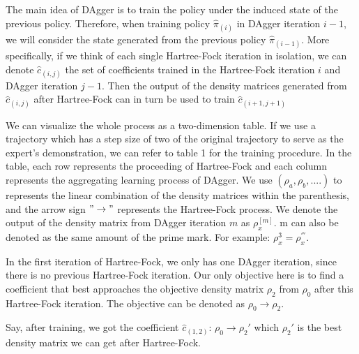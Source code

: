 \documentclass[twoside]{article}
\begin{document}


The main idea of DAgger is to train the policy under the induced state of the previous policy. Therefore, when training policy $\hat{\pi}_{(i)}$ in DAgger iteration $i-1$,
we will consider the state generated from the previous policy $\hat{\pi}_{(i-1)}$. More specifically, if we think of each single Hartree-Fock iteration in isolation, we can denote $\hat{c}_{(i,j)}$ the set of coefficients trained in the Hartree-Fock iteration $i$ and DAgger iteration $j-1$. Then the output of the density matrices generated from $\hat{c}_{(i,j)}$ after Hartree-Fock can in turn be used to train $\hat{c}_{(i+1,j+1)}$



We can visualize the whole process as a two-dimension table. If we use a trajectory which has a step size of two of the original trajectory to serve as the expert's demonstration, we can refer to table 1 for the training procedure.
In the table, each row represents the proceeding of Hartree-Fock and each column represents the aggregating learning process of DAgger. We use $(\rho_a, \rho_b, ....)$ to represents the linear combination of the density matrices within the parenthesis, and the arrow sign $"\rightarrow"$ represents the Hartree-Fock process. We denote the output of the density matrix from DAgger iteration $m$ as $\rho_x^{[m]}$. m can also be denoted as the same amount of the prime mark. For example: $\rho_x^{3} = \rho_x^{'''}$.

In the first iteration of Hartree-Fock, we only has one DAgger iteration, since there is no previous Hartree-Fock iteration. Our only objective here is to find a coefficient that best approaches the objective density matrix $\rho_2$ from  $\rho_0$ after this Hartree-Fock iteration. The objective can be denoted as $\rho_0 \rightarrow \rho_2$. 

Say, after training, we got the coefficient $\hat{c}_{(1,2)}$: $\rho_0 \rightarrow \rho_{2}'$ which $\rho_2'$ is the best density matrix we can get after Hartree-Fock.
\end{document}
